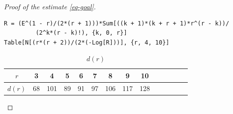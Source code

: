 \documentclass[12pt]{amsart}
\theoremstyle{definition}
\begin{document}
\begin{proof}[Proof of the estimate \eqref{eq-goal}]
\begin{lstlisting}
R = (E^(1 - r)/(2*(r + 1)))*Sum[((k + 1)*(k + r + 1)*r^(r - k))/
         (2^k*(r - k)!), {k, 0, r}]
Table[N[(r*(r + 2))/(2*(-Log[R]))], {r, 4, 10}]
\end{lstlisting}

\begin{table}[!htp]
    \centering
    \caption{$d(r)$}
    \label{tab:d(r)}
   \begin{tabular} {|c|c|c|c|c|c|c|c|c|c|c|c|c|c|} 
\hline
   $r$ & 3
   & 4 & 5& 6& 7 & 8& 9& 10 %
   \\
   \hline
   $d(r)$ & 68
   & 101 & 89 & 91 & 97 
   & 106 & 117 & 128 %
   \\ 
   \hline
\end{tabular}
\end{table}



\end{proof}
\end{document}
